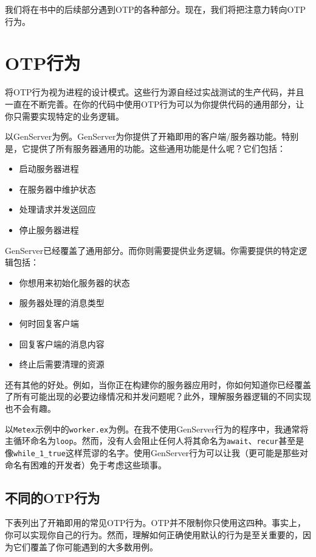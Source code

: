 我们将在书中的后续部分遇到OTP的各种部分。现在，我们将把注意力转向OTP行为。

 \section{OTP行为}

将OTP行为视为进程的设计模式。这些行为源自经过实战测试的生产代码，并且一直在不断完善。在你的代码中使用OTP行为可以为你提供代码的通用部分，让你只需要实现特定的业务逻辑。

以GenServer为例。GenServer为你提供了开箱即用的客户端/服务器功能。特别是，它提供了所有服务器通用的功能。这些通用功能是什么呢？它们包括：

\begin{itemize}

\item  启动服务器进程
\item  在服务器中维护状态
\item  处理请求并发送回应
\item  停止服务器进程
\end{itemize}

GenServer已经覆盖了通用部分。而你则需要提供业务逻辑。你需要提供的特定逻辑包括：

\begin{itemize}
\item  你想用来初始化服务器的状态
\item  服务器处理的消息类型
\item  何时回复客户端
\item  回复客户端的消息内容
\item  终止后需要清理的资源
\end{itemize}

还有其他的好处。例如，当你正在构建你的服务器应用时，你如何知道你已经覆盖了所有可能出现的必要边缘情况和并发问题呢？此外，理解服务器逻辑的不同实现也不会有趣。

以\texttt{Metex}示例中的\texttt{worker.ex}为例。在我不使用GenServer行为的程序中，我通常将主循环命名为\texttt{loop}。然而，没有人会阻止任何人将其命名为\texttt{await}、\texttt{recur}甚至是像\texttt{while\_1\_true}这样荒谬的名字。使用GenServer行为可以让我（更可能是那些对命名有困难的开发者）免于考虑这些琐事。

\subsection{不同的OTP行为}

下表列出了开箱即用的常见OTP行为。OTP并不限制你只使用这四种。事实上，你可以实现你自己的行为。然而，理解如何正确使用默认的行为是至关重要的，因为它们覆盖了你可能遇到的大多数用例。


